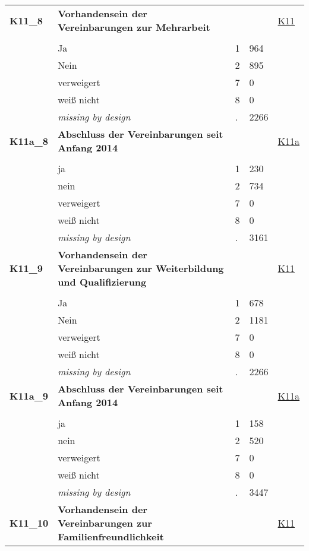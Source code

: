 \begin{longtable}{| L{2.65cm} | L{8cm} | C{1.5cm} | R{1.25cm} | C{2.25cm}  |}
   \midrule
\textbf{K11\_8}\label{var:K11:8} & \textbf{Vorhandensein der Vereinbarungen zur Mehrarbeit} &  &  & \hyperref[K11]{K11} \\ 
   &  &  &  &  \\ 
   & Ja & 1 & 964 &  \\ 
   & Nein & 2 & 895 &  \\ 
   & verweigert & 7 & 0 &  \\ 
   & weiß nicht & 8 & 0 &  \\ 
   & \textit{missing by design} & \textit{.} & 2266 &  \\ 
   \midrule
\textbf{K11a\_8}\label{var:K11a:8} & \textbf{Abschluss der Vereinbarungen seit Anfang 2014} &  &  & \hyperref[K11a]{K11a} \\ 
   &  &  &  &  \\ 
   & ja & 1 & 230 &  \\ 
   & nein & 2 & 734 &  \\ 
   & verweigert & 7 & 0 &  \\ 
   & weiß nicht & 8 & 0 &  \\ 
   & \textit{missing by design} & \textit{.} & 3161 &  \\ 
   \midrule
\textbf{K11\_9}\label{var:K11:9} & \textbf{Vorhandensein der Vereinbarungen zur Weiterbildung und Qualifizierung} &  &  & \hyperref[K11]{K11} \\ 
   &  &  &  &  \\ 
   & Ja & 1 & 678 &  \\ 
   & Nein & 2 & 1181 &  \\ 
   & verweigert & 7 & 0 &  \\ 
   & weiß nicht & 8 & 0 &  \\ 
   & \textit{missing by design} & \textit{.} & 2266 &  \\ 
   \midrule
\textbf{K11a\_9}\label{var:K11a:9} & \textbf{Abschluss der Vereinbarungen seit Anfang 2014} &  &  & \hyperref[K11a]{K11a} \\ 
   &  &  &  &  \\ 
   & ja & 1 & 158 &  \\ 
   & nein & 2 & 520 &  \\ 
   & verweigert & 7 & 0 &  \\ 
   & weiß nicht & 8 & 0 &  \\ 
   & \textit{missing by design} & \textit{.} & 3447 &  \\ 
   \midrule
\textbf{K11\_10}\label{var:K11:10} & \textbf{Vorhandensein der Vereinbarungen zur Familienfreundlichkeit} &  &  & \hyperref[K11]{K11} \\ 

\end{longtable}
